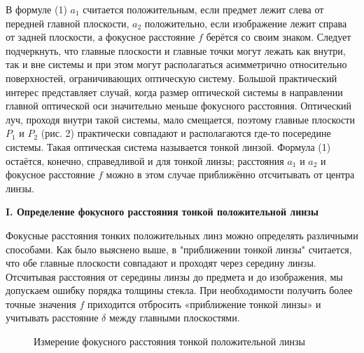 \documentclass[14pt]{article}
\begin{document}
В формуле (1) $a_1$ считается положительным, если предмет лежит слева
от передней главной плоскости, $a_2$ положительно, если изображение
лежит справа от задней плоскости,
а фокусное расстояние
$f$ берётся со
своим знаком.
Следует подчеркнуть, что главные плоскости
и главные точки могут
лежать
как внутри, так
и вне системы
и при этом могут располагаться
асимметрично относительно поверхностей, ограничивающих оптическую
систему.
Большой практический интерес представляет случай,
когда размер
оптической системы в направлении главной оптической оси значительно
меньше фокусного расстояния. Оптический луч, проходя внутри такой
системы, мало смещается, поэтому главные плоскости
$P_1$ и
$P_2$ (рис. 2)
практически совпадают
и располагаются где-то посередине системы.
Такая
оптическая система называется тонкой линзой. Формула (1) остаётся,
конечно, справедливой
и для тонкой линзы; расстояния
$a_1$ и $a_2$ и фокусное расстояние
$f$ можно в этом случае приближённо отсчитывать
от центра линзы.

\vspace{1cm}
\textbf{I. Определение фокусного расстояния тонкой положительной линзы}

Фокусные расстояния тонких положительных линз можно определять
различными способами. Как было выяснено выше, в "приближении
тонкой линзы" считается, что обе главные плоскости совпадают и
проходят через середину линзы. Отсчитывая расстояния от середины
линзы до предмета
и до изображения, мы допускаем ошибку порядка
толщины стекла. При необходимости получить более точные значения
$f$
приходится отбросить «приближение тонкой линзы»
и учитывать расстояние
$\delta$ между главными плоскостями.

\begin{figure}[h!]
	\caption{Измерение фокусного расстояния тонкой положительной линзы}
	\label{fig:image}
\end{figure}
\end{document}
